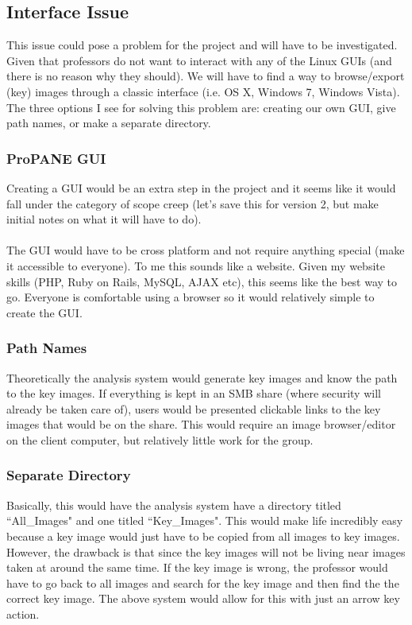 \documentclass[]{article}
\begin{document}
		\subsection{Interface Issue}
			This issue could pose a problem for the project and will have to be investigated. Given that professors do not want to interact with any of the Linux GUIs (and there is no reason why they should). We will have to find a way to browse/export (key) images through a classic interface (i.e. OS X, Windows 7, Windows Vista). The three options I see for solving this problem are: creating our own GUI, give path names, or make a separate directory. 
			
			\subsubsection{ProPANE GUI}
				Creating a GUI would be an extra step in the project and it seems like it would fall under the category of scope creep (let's save this for version 2, but make initial notes on what it will have to do).\\
				\\
				The GUI would have to be cross platform and not require anything special (make it accessible to everyone). To me this sounds like a website. Given my website skills (PHP, Ruby on Rails, MySQL, AJAX etc), this seems like the best way to go. Everyone is comfortable using a browser so it would relatively simple to create the GUI.
				
			\subsubsection{Path Names}
				Theoretically the analysis system would generate key images and know the path to the key images. If everything is kept in an SMB share (where security will already be taken care of), users would be presented clickable links to the key images that would be on the share. This would require an image browser/editor on the client computer, but relatively little work for the group.
				
			\subsubsection{Separate Directory}
				Basically, this would have the analysis system have a directory titled ``All\_Images" and one titled ``Key\_Images". This would make life incredibly easy because a key image would just have to be copied from all images to key images. However, the drawback is that since the key images will not be living near images taken at around the same time. If the key image is wrong, the professor would have to go back to all images and search for the key image and then find the the correct key image. The above system would allow for this with just an arrow key action. 
	
\end{document}
